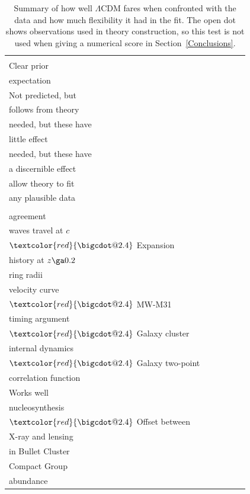 \documentclass[fleqn,usenatbib,useAMS,onecolumn]{mnras} %
\makeatletter
\DeclareRobustCommand*\bigcdot{\mathpalette\bigcdot@{2.4}}
\DeclareRobustCommand*\bigcdot@[2]{\mathbin{\vcenter{\hbox{\scalebox{#2}{$\m@th#1\bullet$}}}}}
\makeatother
\begin{document}
\begin{table}
	\centering
	\caption{Summary of how well $\Lambda$CDM fares when confronted with the data and how much flexibility it had in the fit. The open dot shows observations used in theory construction, so this test is not used when giving a numerical score in Section~\ref{Conclusions}.}
	\begin{tabular}{llllll}
		\hline
		\makecell{} & \makecell{\\ Clear prior \\ expectation} & \makecell{\\ Not predicted, but \\ follows from theory} & \makecell{Auxiliary assumptions \\ needed, but these have \\ little effect} & \makecell{Auxiliary assumptions \\ needed, but these have \\ a discernible effect} & \makecell{Auxiliary assumptions \\ allow theory to fit \\ any plausible data} \\ \hline
		\makecell{Excellent \\ agreement} & \makecell{$\textcolor{red}{\bigcdot}$ Gravitational \\ waves travel at $c$ \\ $\textcolor{red}{\bigcdot}$ Expansion \\ history at $z \ga 0.2$} & \makecell{$\textcolor{red}{\bigcdot}$ Einstein \\ ring radii} & \makecell{} & \makecell{$\textcolor{red}{\bigodot}$ CMB anisotropies} & \makecell{$\textcolor{red}{\bigcdot}$ MW escape \\ velocity curve \\ $\textcolor{red}{\bigcdot}$ MW-M31 \\ timing argument \\ $\textcolor{red}{\bigcdot}$ Galaxy cluster \\ internal dynamics \\ $\textcolor{red}{\bigcdot}$ Galaxy two-point \\ correlation function} \\ \hline
		Works well & \makecell{$\textcolor{red}{\bigcdot}$ Big Bang \\ nucleosynthesis \\ $\textcolor{red}{\bigcdot}$ Offset between \\ X-ray and lensing \\ in Bullet Cluster} & \makecell{} & \makecell{} & \makecell{$\textcolor{red}{\bigcdot}$ Hickson \\ Compact Group \\ abundance} & \makecell{} \\ \hline

\end{tabular}
\end{table}
\end{document}
